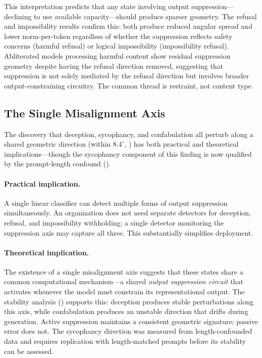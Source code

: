 This interpretation predicts that any state involving output suppression---declining to use available capacity---should produce sparser geometry. The refusal and impossibility results confirm this: both produce reduced angular spread and lower norm-per-token regardless of whether the suppression reflects safety concerns (harmful refusal) or logical impossibility (impossibility refusal). Abliterated models processing harmful content show residual suppression geometry despite having the refusal direction removed, suggesting that suppression is not solely mediated by the refusal direction but involves broader output-constraining circuitry. The common thread is restraint, not content type.

\subsection{The Single Misalignment Axis}

The discovery that deception, sycophancy, and confabulation all perturb along a shared geometric direction (within $8.4^{\circ}$, ) has both practical and theoretical implications---though the sycophancy component of this finding is now qualified by the prompt-length confound ().

\paragraph{Practical implication.} A single linear classifier can detect multiple forms of output suppression simultaneously. An organization does not need separate detectors for deception, refusal, and impossibility withholding; a single detector monitoring the suppression axis may capture all three. This substantially simplifies deployment.

\paragraph{Theoretical implication.} The existence of a single misalignment axis suggests that these states share a common computational mechanism---a shared \emph{output suppression circuit} that activates whenever the model must constrain its representational output. The stability analysis () supports this: deception produces stable perturbations along this axis, while confabulation produces an unstable direction that drifts during generation. Active suppression maintains a consistent geometric signature; passive error does not. The sycophancy direction was measured from length-confounded data and requires replication with length-matched prompts before its stability can be assessed.

